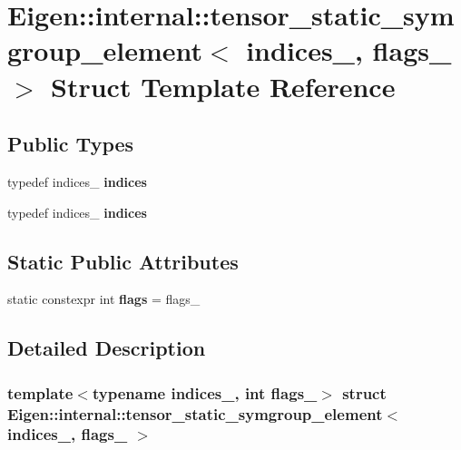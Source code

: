 \hypertarget{struct_eigen_1_1internal_1_1tensor__static__symgroup__element}{}\section{Eigen\+:\+:internal\+:\+:tensor\+\_\+static\+\_\+symgroup\+\_\+element$<$ indices\+\_\+, flags\+\_\+ $>$ Struct Template Reference}
\label{struct_eigen_1_1internal_1_1tensor__static__symgroup__element}
\subsection*{Public Types}
\begin{DoxyCompactItemize}
\item 
\mbox{\label{struct_eigen_1_1internal_1_1tensor__static__symgroup__element_a5ebcaf31de200e1dd592e77c15d79fa4}} 
typedef indices\+\_\+ {\bfseries indices}
\item 
\mbox{\label{struct_eigen_1_1internal_1_1tensor__static__symgroup__element_a5ebcaf31de200e1dd592e77c15d79fa4}} 
typedef indices\+\_\+ {\bfseries indices}
\end{DoxyCompactItemize}
\subsection*{Static Public Attributes}
\begin{DoxyCompactItemize}
\item 
\mbox{\label{struct_eigen_1_1internal_1_1tensor__static__symgroup__element_a58f995a62fa78cacd915a4b4ef0430b3}} 
static constexpr int {\bfseries flags} = flags\+\_\+
\end{DoxyCompactItemize}


\subsection{Detailed Description}
\subsubsection*{template$<$typename indices\+\_\+, int flags\+\_\+$>$\newline
struct Eigen\+::internal\+::tensor\+\_\+static\+\_\+symgroup\+\_\+element$<$ indices\+\_\+, flags\+\_\+ $>$}



